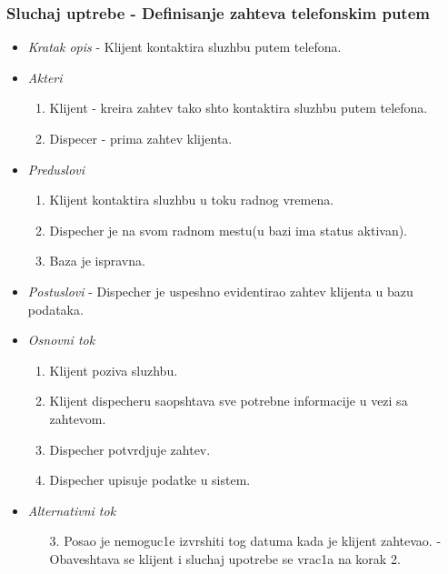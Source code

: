 \documentclass[10 pt]{article}
\begin{document}
	\subsubsection{Sluchaj uptrebe - Definisanje zahteva telefonskim putem}
	
		\begin{itemize}
			
			\item\textit{Kratak opis} - Klijent kontaktira sluzhbu putem telefona.

			
			\item\textit{Akteri} 
				\begin{enumerate}
					\item Klijent - kreira zahtev tako shto kontaktira sluzhbu putem telefona.
					\item Dispecer - prima zahtev klijenta.
				\end{enumerate}

			
			\item\textit{Preduslovi} 
				\begin{enumerate}
					\item Klijent kontaktira sluzhbu u toku  radnog vremena.
					\item Dispecher je na svom radnom mestu(u bazi ima status aktivan).

					\item Baza je ispravna.

				\end{enumerate}
			
			\item\textit{Postuslovi} - Dispecher je uspeshno evidentirao zahtev klijenta u bazu podataka.

			
			\item\textit{Osnovni tok}

				\begin{enumerate}
					\item Klijent poziva sluzhbu.

					\item Klijent dispecheru saopshtava sve potrebne informacije u vezi sa zahtevom.

					\item Dispecher potvrdjuje zahtev.

					\item Dispecher upisuje podatke u sistem.

				\end{enumerate}
			
			\item\textit{Alternativni tok}
				\begin{enumerate}
					\item [3.] Posao je nemoguc1e izvrshiti tog datuma kada je klijent zahtevao.
- Obaveshtava se klijent i sluchaj upotrebe se vrac1a na korak 2.


\end{enumerate}
\end{itemize}
\end{document}
